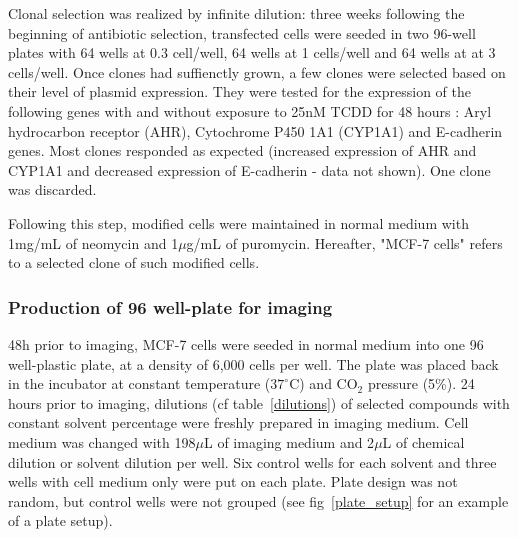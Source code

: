 Clonal selection was realized by infinite dilution: three weeks following the beginning of antibiotic selection, transfected cells were seeded in two 96-well plates with 64 wells at 0.3 cell/well, 64 wells at 1 cells/well and 64 wells at at 3 cells/well. Once clones had suffienctly grown, a few clones were selected based on their level of plasmid expression. They were tested for the expression of the following genes with and without exposure to 25nM TCDD for 48 hours%
: Aryl hydrocarbon receptor  (AHR), Cytochrome P450 1A1 (CYP1A1) and E-cadherin genes. Most clones responded as expected (increased expression of AHR and CYP1A1 and decreased expression of E-cadherin - data not shown). One clone was discarded.

Following this step, modified cells were maintained in normal medium with 1mg/mL of neomycin and 1$\mu$g/mL of puromycin. Hereafter, "MCF-7 cells" refers to a selected clone of such modified cells.


\subsubsection{Production of 96 well-plate for imaging}
48h prior to imaging, MCF-7 cells were seeded in normal medium into one 96 well-plastic plate, at a density of 6,000 cells per well. The plate was placed back in the incubator at constant temperature ($37^\circ$C) and CO$_2$ pressure (5\%). 24 hours prior to imaging, dilutions (cf table~\ref{dilutions}) of selected compounds with constant solvent percentage were freshly prepared in imaging medium. Cell medium was changed with 198$\mu$L of imaging medium and 2$\mu$L of chemical dilution or solvent dilution per well. Six control wells for each solvent and three wells with cell medium only were put on each plate. Plate design was not random, but control wells were not grouped (see fig~\ref{plate_setup} for an example of a plate setup).

